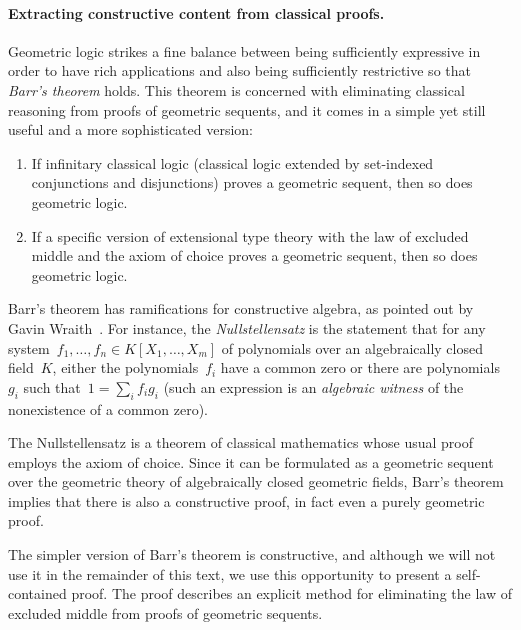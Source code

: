 \documentclass{ws-rv9x6}
\begin{document}
{\paragraph{Extracting constructive content from classical proofs.}\label{par:barr}
Geometric logic strikes a fine balance between being sufficiently expressive in order to
have rich applications and also being sufficiently restrictive so that \emph{Barr's
theorem} holds. This theorem is concerned with eliminating classical reasoning
from proofs of geometric sequents, and it comes in a simple yet still useful
and a more sophisticated version:
\begin{enumerate}
\item If infinitary classical logic (classical logic extended by set-indexed
conjunctions and disjunctions) proves a geometric sequent, then so does
geometric logic.
\item If a specific version of extensional type theory with the law of excluded
middle and the axiom of choice proves a geometric sequent, then so does
geometric logic.
\end{enumerate}
Barr's theorem has ramifications for constructive algebra, as pointed out by
Gavin Wraith~\cite{wraith:intuitionistic-algebra}.
For instance, the \emph{Nullstellensatz} is the statement that for any
system~$f_1,\ldots,f_n \in K[X_1,\ldots,X_m]$ of polynomials over an
algebraically closed field~$K$, either the polynomials~$f_i$ have a common zero
or there are polynomials~$g_i$ such that~$1 = \sum_i f_i g_i$ (such an
expression is an \emph{algebraic witness} of the nonexistence of a common
zero).

The Nullstellensatz is a theorem of classical mathematics whose usual proof employs the
axiom of choice. Since it can be formulated as a geometric sequent over the
geometric theory of algebraically closed geometric fields, Barr's theorem
implies that there is also a constructive proof, in fact even a purely
geometric proof.

The simpler version of Barr's theorem is constructive, and although we will not
use it in the remainder of this text, we use this opportunity to present a
self-contained proof. The proof describes an explicit method for eliminating
the law of excluded middle from proofs of geometric sequents.

}
\end{document}

